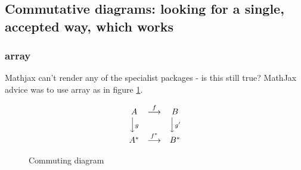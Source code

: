 \documentclass[12pt,a4paper]{article}
\newcommand{\PICalt}[1]{{#1}}
\theoremstyle{clearprint}
\newcommand{\End}{\mathrm{End}}
\newcommand{\mapright}[1]{{\stackrel{#1}{\longrightarrow}}}
\newcommand{\mapdown}[1]{\Big\downarrow{\scriptstyle{#1}}}
\newcommand{\tab}{&}
\begin{document}
\subsection[Commutative diagrams]{Commutative diagrams: looking for a single, accepted way, which works}
\setcounter{equation}{0}

\subsubsection[array]{array}

Mathjax can't render any of the specialist packages - is this still true? MathJax advice was to use array as in figure \ref{commute}. %

\begin{figure}[!htb]
\PICalt{\begin{equation*}
\begin{array}{ccc}
 A\tab \mapright{f} \tab B \\
 \mapdown{g} \tab \tab \mapdown{g'} \\
 A^* \tab \mapright{f^*} \tab B^*
\end{array}
\end{equation*}}
\caption{Commuting diagram}\label{commute}
\end{figure}




\end{document}
